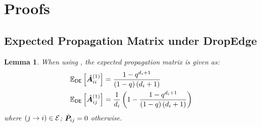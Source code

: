 \section{Proofs}
\label{sec:proofs}

\newtheorem*{lemma*}{Lemma}
\newtheorem*{theorem*}{Theorem}


\subsection{Expected Propagation Matrix under DropEdge}
\label{sec:proofs-lemma}

\begin{lemma*}
    When using , the expected propagation matrix is given as:
    \begin{align*}
        \mathbb{E}_{\mathsf{DE}} \left[\hat{\bm{A}}^{\left(1\right)}_{ii}\right] &= \frac{1-q^{d_i+1}}{\left(1-q\right)\left(d_i+1\right)} \\
        \mathbb{E}_{\mathsf{DE}} \left[\hat{\bm{A}}^{\left(1\right)}_{ij}\right] &= \frac{1}{d_i}\left(1 - \frac{1-q^{d_i+1}}{\left(1-q\right)\left(d_i+1\right)}\right)
    \end{align*}
    where $\left(j\to i\right) \in \mathcal{E}$; $\dot{\bm{P}}_{ij} = 0$ otherwise.
\end{lemma*}

